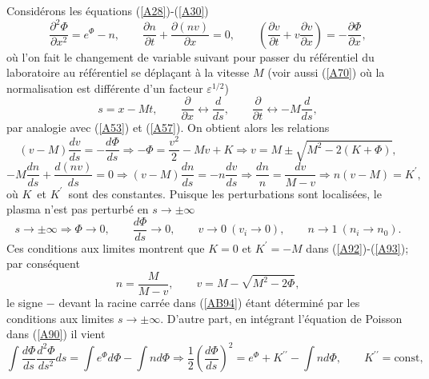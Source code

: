 \documentclass[10pt,thmsa]{article}
\begin{document}
Consid\'{e}rons les \'{e}quations (\ref{A28})-(\ref{A30})
\begin{equation}
\frac{\partial^{2}\Phi}{\partial x^{2}}=e^{\Phi}-n,\qquad\frac{\partial
n}{\partial t}+\frac{\partial(nv)}{\partial x}=0,\qquad\left(  \frac{\partial
v}{\partial t}+v\frac{\partial v}{\partial x}\right)  =-\frac{\partial\Phi
}{\partial x},\label{A90}%
\end{equation}
o\`{u} l'on fait le changement de variable suivant pour passer du
r\'{e}f\'{e}rentiel du laboratoire au r\'{e}f\'{e}rentiel se d\'{e}pla\c{c}ant
\`{a} la vitesse $M$ (voir aussi (\ref{A70}) o\`{u} la normalisation est
diff\'{e}rente d'un facteur $\varepsilon^{1/2}$)
\begin{equation}
s=x-Mt,\qquad\frac{\partial}{\partial x}\leftrightarrow\frac{d}{ds}%
,\qquad\frac{\partial}{\partial t}\leftrightarrow-M\frac{d}{ds},\label{A91}%
\end{equation}
par analogie avec (\ref{A53}) et (\ref{A57}). On obtient alors les relations
\begin{equation}
(v-M)\frac{dv}{ds}=-\frac{d\Phi}{ds}\Rightarrow-\Phi=\frac{v^{2}}%
{2}-Mv+K\Rightarrow v=M\pm\sqrt{M^{2}-2(K+\Phi)},\label{A92}%
\end{equation}%
\begin{equation}
-M\frac{dn}{ds}+\frac{d(nv)}{ds}=0\Rightarrow(v-M)\frac{dn}{ds}=-n\frac
{dv}{ds}\Rightarrow\frac{dn}{n}=\frac{dv}{M-v}\Rightarrow n(v-M)=K^{\prime
},\label{A93}%
\end{equation}
o\`{u} $K$\ et $K^{\prime}$\ sont des constantes. Puisque les perturbations
sont localis\'{e}es, le plasma n'est pas perturb\'{e} en $s\rightarrow
\pm\infty$%
\begin{equation}
s\rightarrow\pm\infty\Rightarrow\Phi\rightarrow0,\qquad\frac{d\Phi}%
{ds}\rightarrow0,\qquad v\rightarrow0\ (v_{i}\rightarrow0),\qquad
n\rightarrow1\ (n_{i}\rightarrow n_{0}).\label{AA94}%
\end{equation}
Ces conditions aux limites montrent que $K=0$ et $K^{\prime}=-M$ dans
(\ref{A92})-(\ref{A93}); par cons\'{e}quent
\begin{equation}
n=\frac{M}{M-v},\qquad v=M-\sqrt{M^{2}-2\Phi},\label{AB94}%
\end{equation}
le signe $-$ devant la racine carr\'{e}e dans (\ref{AB94}) \'{e}tant
d\'{e}termin\'{e} par les conditions aux limites $s\rightarrow\pm\infty.$
D'autre part, en int\'{e}grant l'\'{e}quation de Poisson dans (\ref{A90}) il
vient
\begin{equation}
\int\frac{d\Phi}{ds}\frac{d^{2}\Phi}{ds^{2}}ds=\int e^{\Phi}d\Phi-\int
nd\Phi\Rightarrow\frac{1}{2}\left(  \frac{d\Phi}{ds}\right)  ^{2}=e^{\Phi
}+K^{\prime\prime}-\int nd\Phi,\qquad K^{\prime\prime}=\mathrm{const}%
,\label{A95}%
\end{equation}
\end{document}
